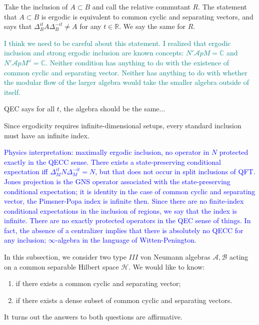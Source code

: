 \documentclass[a4paper,11pt]{article}
\theoremstyle{definition}
\newcommand{\NL}[1]{\textcolor{blue}{#1}}
\newcommand{\YC}[1]{\textcolor{teal}{#1}}
\begin{document}
Take the inclusion of $A\subset B$ and call the relative commutant $R$. The statement that $A\subset B$ is ergodic is equivalent to common cyclic and separating vectors, and says that $\Delta_B^{it}A \Delta_B^{-it}\neq A$ for any $t\in \mathbb{R}$. We say the same for $R$. 

\YC{I think we need to be careful about this statement. I realized that ergodic inclusion and strong ergodic inclusion are known concepts: $N'\mathcal{A}p M = \mathbb{C}$ and $N'\mathcal{A}p M^\omega = \mathbb{C}$. Neither condition has anything to do with the existence of common cyclic and separating vector. Neither has anything to do with whether the modular flow of the larger algebra would take the smaller algebra outside of itself. }

QEC says for all $t$, the algebra should be the same...

Since ergodicity requires infinite-dimensional setups, every standard inclusion must have an infinite index. 





\NL{Physics interpretation: maximally ergodic inclusion, no operator in $N$ protected exactly in the QECC sense. There exists a state-preserving conditional expectation iff $\Delta_M^{it}N\Delta_M^{-it}=N$, but that does not occur in split inclusions of QFT. Jones projection is the GNS operator associated with the state-preserving conditional expectation; it is identity in the case of common cyclic and separating vector, the Pimsner-Popa index is infinite then. Since there are no finite-index conditional expectations in the inclusion of regions, we say that the index is infinite. There are no exactly protected operators in the QEC sense of things. In fact, the absence of a centralizer implies that there is absolutely no QECC for any inclusion; $\infty$-algebra in the language of Witten-Penington.}


In this subsection, we consider two type $III$ von Neumann algebras $\mathcal{A},\mathcal{B}$ acting on a common separable Hilbert space $\mathcal{H}$. We would like to know:
\begin{enumerate}
    \item if there exists a common cyclic and separating vector;
    \item if there exists a dense subset of common cyclic and separating vectors.
\end{enumerate}
It turns out the answers to both questions are affirmative.
\end{document}
